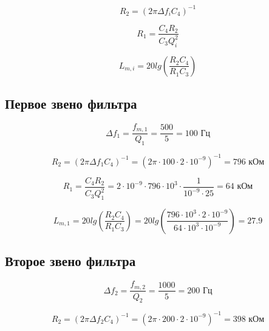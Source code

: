 \begin{equation}
	\label{eq:4:2}
	R_2 = (2 \pi \Delta f_i C_4)^{-1}
\end{equation}

\begin{equation}
	\label{eq:4:3}
	R_1 = \frac{C_4 R_2}{C_3 Q_i^2}
\end{equation}

\begin{equation}
	\label{eq:4:4}
	L_{m,i} = 20 lg \left( \frac{R_2 C_4}{R_1 C_3} \right)
\end{equation}

\subsection{Первое звено фильтра}

\begin{displaymath}
	\Delta f_1 = \frac{f_{m,1}}{Q_1} = \frac{500}{5} = 100 \text{ Гц}
\end{displaymath}

\begin{displaymath}
	R_2 = (2 \pi \Delta f_1 C_4)^{-1} = (2 \pi \cdot 100 \cdot 2 \cdot 10^{-9})^{-1} = 796 \text{ кОм}
\end{displaymath}

\begin{displaymath}
	R_1 = \frac{C_4 R_2}{C_3 Q_1^2} = 2 \cdot 10^{-9} \cdot 796 \cdot 10^3 \cdot \frac{1}{10^{-9} \cdot 25} = 64 \text{ кОм}
\end{displaymath}

\begin{displaymath}
	L_{m,1} = 20 lg \left( \frac{R_2 C_4}{R_1 C_3} \right) = 20 lg \left( \frac{796 \cdot 10^3 \cdot 2 \cdot 10^{-9}}{64 \cdot 10^3 \cdot 10^{-9}} \right) = 27.9
\end{displaymath}

\subsection{Второе звено фильтра}

\begin{displaymath}
	\Delta f_2 = \frac{f_{m,2}}{Q_2} = \frac{1000}{5} = 200 \text{ Гц}
\end{displaymath}

\begin{displaymath}
	R_2 = (2 \pi \Delta f_2 C_4)^{-1} = (2 \pi \cdot 200 \cdot 2 \cdot 10^{-9})^{-1} = 398 \text{ кОм}
\end{displaymath}

